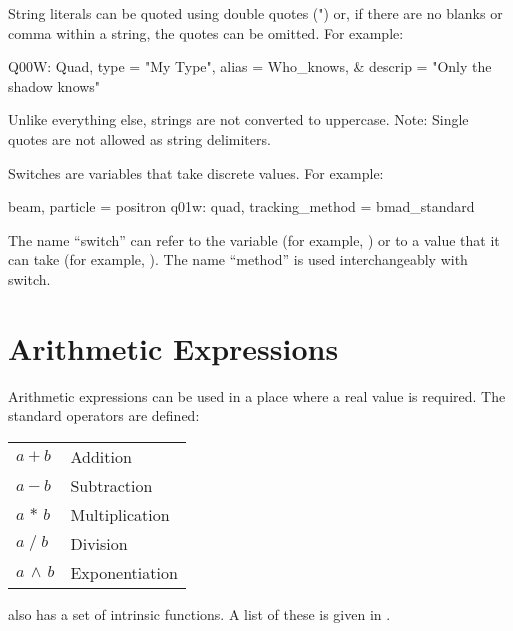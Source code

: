 String literals can be quoted using double quotes (") or, if there are no
blanks or comma within a string, the quotes can be omitted. For example:
\begin{example}
  Q00W: Quad, type = "My Type", alias = Who_knows, &
                                  descrip = "Only the shadow knows"
\end{example}
Unlike everything else, strings are not converted to uppercase. Note:
Single quotes are not allowed as string delimiters.

Switches are variables that take discrete values. For example:
\begin{example}
  beam, particle = positron          
  q01w: quad, tracking\_method = bmad\_standard 
\end{example}
The name ``switch'' can refer to the variable (for example,
) or to a value that it can take (for example,
). The name ``method'' is used interchangeably with switch.

\section{Arithmetic Expressions}

Arithmetic expressions can be used in a place where a real value is required.
The standard operators are defined: \hfil\break
\hspace*{0.15in}
\begin{tabular}{ll}
  $a + b$           & Addition        \\
  $a - b$           & Subtraction     \\
  $a \, \ast \, b$  & Multiplication  \\
  $a \; / \; b$     & Division        \\
  $a \, \land \, b$ & Exponentiation  \\
\end{tabular}
\bmad also has a set of intrinsic functions. A list of these is given
in .

